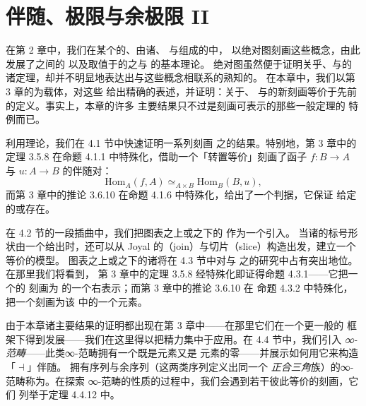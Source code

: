 \chapter{伴随、极限与余极限 II}\label{ch:adjunctions-limits-colimits-II}


在第 2 章中，我们在某个\trInfinityCosmos{}的、由诸\trInfinityCategory{}、%
\trFunctor{}与\trNaturalTransformation{}组成的\trHomotopyTwoCategory{}中，%
以绝对\trLifting{}图刻画这些概念，由此发展了\trInfinityCategory{}之间的%
\trAdjunction{}以及取值于\trInfinityCategory{}的\trDiagram{}之\trLimit{}与%
\trColimit{}的基本理论。
绝对\trLifting{}图虽然便于证明关乎\trAdjunction{}、\trLimit{}与\trColimit{}的%
诸定理，却并不明显地表达出与这些概念相联系的熟知的\trUniversalProperty。%
在本章中，我们以第 3 章的\trCommaInfinityCategory{}为载体，对这些%
\trUniversalProperty{}给出精确的表述，并证明：关于\trAdjunction{}、%
\trLimit{}与\trColimit{}的新刻画等价于先前的定义。事实上，本章的许多%
主要结果只不过是刻画可表示\trCommaInfinityCategory{}的那些一般定理的%
特例而已。

利用\trCommaInfinityCategory{}理论，我们在 4.1 节中快速证明一系列刻画%
\trAdjunction{}之\trUniversalProperty{}的结果。特别地，第 3 章中的%
定理 3.5.8 在命题 4.1.1 中特殊化，借助一个「转置等价」刻画了函子%
$f\colon B\to A$ 与 $u\colon A\to B$ 的伴随对：
\[
  \mathrm{Hom}_A(f,A)\simeq_{A\times B}\mathrm{Hom}_B(B,u),
\]
而第 3 章中的推论 3.6.10 在命题 4.1.6 中特殊化，给出了一个判据，它保证%
给定\trFunctor{}的\trLeftAdjoint{}或\trRightAdjoint{}存在。

在 4.2 节的一段插曲中，我们把图表之上或之下的%
\emph{\trInfinityCategoryOfCones}作为一个\trCommaInfinityCategory{}引入。%
当诸\trDiagram{}的标号形状由一个\trSimplicialSet{}给出时，还可以从 Joyal%
的\trJoin（join）与切片（slice）构造出发，建立一个等价的模型。
图表之上或之下的诸\trInfinityCategoryOfCones{}将在 4.3 节中对\trLimit{}与%
\trColimit{}之\trUniversalProperty{}的研究中占有突出地位。在那里我们将看到，%
第 3 章中的定理 3.5.8 经特殊化即证得命题 4.3.1——它把一个\trDiagram{}的%
\trLimit{}刻画为%
\trInfinityCategoryOfCones{}的一个右表示；而第 3 章中的推论 3.6.10 在%
命题 4.3.2 中特殊化，把一个\trLimit\trCone{}刻画为该%
\trInfinityCategoryOfCones{}中的一个\trTerminal{}元素。

由于本章诸主要结果的证明都出现在第 3 章中——在那里它们在一个更一般的%
框架下得到发展——我们在这里得以把精力集中于应用。在 4.4 节中，我们引入%
\emph{\trPointed{}∞-范畴}——此类∞-范畴拥有一个既是\trInitial{}元素又是%
\trTerminal{}元素的零\trElement{}——并展示如何用它来构造%
「\trLoops$\dashv$\trSuspension{}」伴随。
拥有\trFiber{}序列与余\trFiber{}序列（这两类序列定义出同一个%
\emph{正合三角}族）的\trPointed{}∞-范畴称为\emph{\trStable}。在探索%
\trStable{}∞-范畴的性质的过程中，我们会遇到若干彼此等价的刻画，它们%
列举于定理 4.4.12 中。

